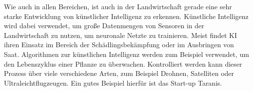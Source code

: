 Wie auch in allen Bereichen, ist auch in der Landwirtschaft gerade eine sehr
starke Entwicklung von künstlicher Intelligenz zu erkennen. Künstliche
Intelligenz wird dabei verwendet, um große Datenmengen von Sensoren in der
Landwirtschaft zu nutzen, um neuronale Netzte zu trainieren. Meist findet KI
ihren Einsatz im Bereich der Schädlingsbekämpfung oder im Ausbringen von Saat.
\cite{mci/Mohr2020} Algorithmen zur künstlichen Intelligenz werden zum Beispiel
verwendet, um den Lebenszyklus einer Pflanze zu überwachen. Kontrolliert werden
kann dieser Prozess über viele verschiedene Arten, zum Beispiel Drohnen,
Satelliten oder Ultraleichtflugzeugen. Ein gutes Beispiel hierfür ist das Start-up Taranis. \cite{wennker2020kunstliche}